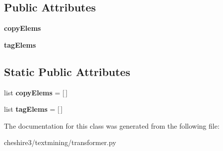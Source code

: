 \subsection*{Public Attributes}
\begin{DoxyCompactItemize}
\item 
\hypertarget{classcheshire3_1_1textmining_1_1transformer_1_1_tsujii_x_path_transformer_a7f1f18f5c2239b1e7d9bc5467cd516d4}{{\bfseries copy\-Elems}}\label{classcheshire3_1_1textmining_1_1transformer_1_1_tsujii_x_path_transformer_a7f1f18f5c2239b1e7d9bc5467cd516d4}

\item 
\hypertarget{classcheshire3_1_1textmining_1_1transformer_1_1_tsujii_x_path_transformer_a60b1deb15e790fdbb6792aaa215a66f5}{{\bfseries tag\-Elems}}\label{classcheshire3_1_1textmining_1_1transformer_1_1_tsujii_x_path_transformer_a60b1deb15e790fdbb6792aaa215a66f5}

\end{DoxyCompactItemize}
\subsection*{Static Public Attributes}
\begin{DoxyCompactItemize}
\item 
\hypertarget{classcheshire3_1_1textmining_1_1transformer_1_1_tsujii_x_path_transformer_aae7a6a4f577389f5abbeed6792f8a16a}{list {\bfseries copy\-Elems} = \mbox{[}$\,$\mbox{]}}\label{classcheshire3_1_1textmining_1_1transformer_1_1_tsujii_x_path_transformer_aae7a6a4f577389f5abbeed6792f8a16a}

\item 
\hypertarget{classcheshire3_1_1textmining_1_1transformer_1_1_tsujii_x_path_transformer_aef3480941588f2ffb9330210bb1f2bf2}{list {\bfseries tag\-Elems} = \mbox{[}$\,$\mbox{]}}\label{classcheshire3_1_1textmining_1_1transformer_1_1_tsujii_x_path_transformer_aef3480941588f2ffb9330210bb1f2bf2}

\end{DoxyCompactItemize}


The documentation for this class was generated from the following file\-:\begin{DoxyCompactItemize}
\item 
cheshire3/textmining/transformer.\-py\end{DoxyCompactItemize}
